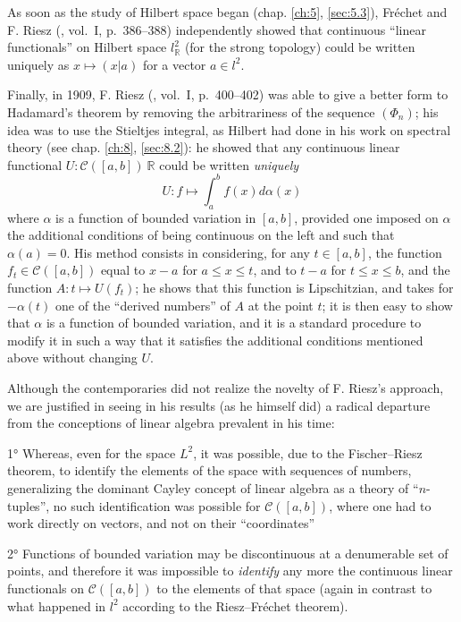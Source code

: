\documentclass[12pt,a4paper,leqno,twoside]{extbook}
\newcommand{\Cont}{\mathcal{C}}
\newcommand{\R}{\mathbb{R}}
\begin{document}
As soon as the study of Hilbert space began (chap. \ref{ch:5}, \ref{sec:5.3}), Fréchet \cite{072} and F. Riesz (\cite{183}, vol.~I, p.~386--388) independently showed that continuous ``linear functionals'' on Hilbert space \(l^2_{\R}\) (for the strong topology) could be written uniquely as \(x \mapsto (x|a)\) for a vector \(a \in l^2\).

Finally, in 1909, F. Riesz (\cite{183}, vol.~I, p.~400--402) was able to give a better form to Hadamard's theorem by removing the arbitrariness of the sequence \((\Phi_n)\); his idea was to use the Stieltjes integral, as Hilbert had done in his work on spectral theory (see chap. \ref{ch:8}, \ref{sec:8.2}): he showed that any continuous linear functional \(U: \Cont([a,b]) \ \R\) could be written \emph{uniquely}
\begin{equation}
    \label{eq:6.3}
    U: f \mapsto \int_a^b f(x) d\alpha(x)
\end{equation}
where \(\alpha\) is a function of bounded variation in \([a,b]\), provided one imposed on \(\alpha\) the additional conditions of being continuous on the left and such that \(\alpha(a) = 0\). His method consists in considering, for any \(t \in [a,b]\), the function \(f_t \in \Cont([a,b])\) equal to \(x-a\) for \(a \leq x \leq t\), and to \(t-a\) for \(t \leq x \leq b\), and the function \(A: t \mapsto U(f_t)\); he shows that this function is Lipschitzian, and takes for \(-\alpha(t)\) one of the ``derived numbers'' of \(A\) at the point \(t\); it is then easy to show that \(\alpha\) is a function of bounded variation, and it is a standard procedure to modify it in such a way that it satisfies the additional conditions mentioned above without changing \(U\).

Although the contemporaries did not realize the novelty of F. Riesz's approach, we are justified in seeing in his results (as he himself did) a radical departure from the conceptions of linear algebra prevalent in his time:

1° Whereas, even for the space \(L^2\), it was possible, due to the Fischer--Riesz theorem, to identify the elements of the space with sequences of numbers, generalizing the dominant Cayley concept of linear algebra as a theory of ``\(n\)-tuples'', no such identification was possible for \(\Cont([a,b])\), where one had to work directly on vectors, and not on their ``coordinates''

2° Functions of bounded variation may be discontinuous at a denumerable set of points, and therefore it was impossible to \emph{identify} any more the continuous linear functionals on \(\Cont([a,b])\) to the elements of that space (again in contrast to what happened in \(l^2\) according to the Riesz--Fréchet theorem).
\end{document}
